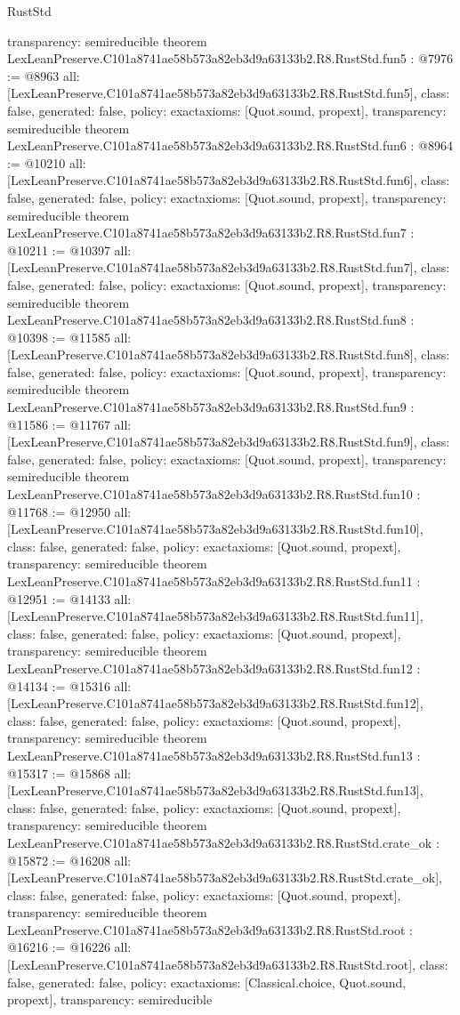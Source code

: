 \begin{lexlean}{RustStd}
\begin{coremodule}
{  transparency: semireducible
}
theorem LexLeanPreserve.C101a8741ae58b573a82eb3d9a63133b2.R8.RustStd.fun5 : @7976 := @8963 {
  all: [LexLeanPreserve.C101a8741ae58b573a82eb3d9a63133b2.R8.RustStd.fun5],
  class: false,
  generated: false,
  policy: exact{axioms: [Quot.sound, propext]},
  transparency: semireducible
}
theorem LexLeanPreserve.C101a8741ae58b573a82eb3d9a63133b2.R8.RustStd.fun6 : @8964 := @10210 {
  all: [LexLeanPreserve.C101a8741ae58b573a82eb3d9a63133b2.R8.RustStd.fun6],
  class: false,
  generated: false,
  policy: exact{axioms: [Quot.sound, propext]},
  transparency: semireducible
}
theorem LexLeanPreserve.C101a8741ae58b573a82eb3d9a63133b2.R8.RustStd.fun7 : @10211 := @10397 {
  all: [LexLeanPreserve.C101a8741ae58b573a82eb3d9a63133b2.R8.RustStd.fun7],
  class: false,
  generated: false,
  policy: exact{axioms: [Quot.sound, propext]},
  transparency: semireducible
}
theorem LexLeanPreserve.C101a8741ae58b573a82eb3d9a63133b2.R8.RustStd.fun8 : @10398 := @11585 {
  all: [LexLeanPreserve.C101a8741ae58b573a82eb3d9a63133b2.R8.RustStd.fun8],
  class: false,
  generated: false,
  policy: exact{axioms: [Quot.sound, propext]},
  transparency: semireducible
}
theorem LexLeanPreserve.C101a8741ae58b573a82eb3d9a63133b2.R8.RustStd.fun9 : @11586 := @11767 {
  all: [LexLeanPreserve.C101a8741ae58b573a82eb3d9a63133b2.R8.RustStd.fun9],
  class: false,
  generated: false,
  policy: exact{axioms: [Quot.sound, propext]},
  transparency: semireducible
}
theorem LexLeanPreserve.C101a8741ae58b573a82eb3d9a63133b2.R8.RustStd.fun10 : @11768 := @12950 {
  all: [LexLeanPreserve.C101a8741ae58b573a82eb3d9a63133b2.R8.RustStd.fun10],
  class: false,
  generated: false,
  policy: exact{axioms: [Quot.sound, propext]},
  transparency: semireducible
}
theorem LexLeanPreserve.C101a8741ae58b573a82eb3d9a63133b2.R8.RustStd.fun11 : @12951 := @14133 {
  all: [LexLeanPreserve.C101a8741ae58b573a82eb3d9a63133b2.R8.RustStd.fun11],
  class: false,
  generated: false,
  policy: exact{axioms: [Quot.sound, propext]},
  transparency: semireducible
}
theorem LexLeanPreserve.C101a8741ae58b573a82eb3d9a63133b2.R8.RustStd.fun12 : @14134 := @15316 {
  all: [LexLeanPreserve.C101a8741ae58b573a82eb3d9a63133b2.R8.RustStd.fun12],
  class: false,
  generated: false,
  policy: exact{axioms: [Quot.sound, propext]},
  transparency: semireducible
}
theorem LexLeanPreserve.C101a8741ae58b573a82eb3d9a63133b2.R8.RustStd.fun13 : @15317 := @15868 {
  all: [LexLeanPreserve.C101a8741ae58b573a82eb3d9a63133b2.R8.RustStd.fun13],
  class: false,
  generated: false,
  policy: exact{axioms: [Quot.sound, propext]},
  transparency: semireducible
}
theorem LexLeanPreserve.C101a8741ae58b573a82eb3d9a63133b2.R8.RustStd.crate_ok : @15872 := @16208 {
  all: [LexLeanPreserve.C101a8741ae58b573a82eb3d9a63133b2.R8.RustStd.crate_ok],
  class: false,
  generated: false,
  policy: exact{axioms: [Quot.sound, propext]},
  transparency: semireducible
}
theorem LexLeanPreserve.C101a8741ae58b573a82eb3d9a63133b2.R8.RustStd.root : @16216 := @16226 {
  all: [LexLeanPreserve.C101a8741ae58b573a82eb3d9a63133b2.R8.RustStd.root],
  class: false,
  generated: false,
  policy: exact{axioms: [Classical.choice, Quot.sound, propext]},
  transparency: semireducible
}


\end{coremodule}
\end{lexlean}

